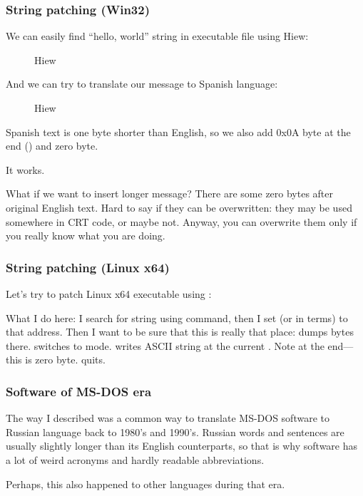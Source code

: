 \subsubsection{String patching (Win32)}

We can easily find ``hello, world'' string in executable file using Hiew:

\begin{figure}[H]
\centering
{}
\caption{Hiew}
\label{}
\end{figure}

And we can try to translate our message to Spanish language:

\begin{figure}[H]
\centering
{}
\caption{Hiew}
\label{}
\end{figure}

Spanish text is one byte shorter than English, so we also add 0x0A byte at the end () and zero byte.

It works.

What if we want to insert longer message?
There are some zero bytes after original English text.
Hard to say if they can be overwritten: they may be used somewhere in \ac{CRT} code, or maybe not.
Anyway, you can overwrite them only if you really know what you are doing.

\subsubsection{String patching (Linux x64)}

\myindex{\radare}
Let's try to patch Linux x64 executable using \radare{}:



What I do here: I search for  string using \TT{/} command, 
then I set  (or  in \radare{} terms) to that address.
Then I want to be sure that this is really that place:  dumps bytes there.
 switches \radare{} to  mode.
 writes ASCII string at the current .
Note  at the end---this is zero byte.
 quits.

\subsubsection{Software  of MS-DOS era}

The way I described was a common way to translate MS-DOS software to Russian language back to 1980's and 1990's.
Russian words and sentences are usually slightly longer than its English counterparts, so that is why 
software has a lot of weird acronyms and hardly readable abbreviations.

Perhaps, this also happened to other languages during that era.

